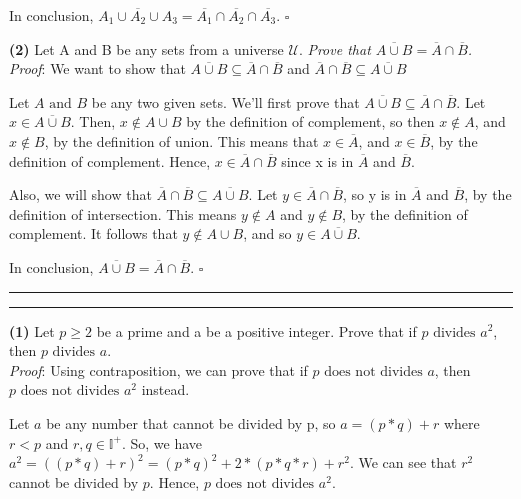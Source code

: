 \documentclass[a4paper, 11pt]{article}
\newcommand{\question}[2] {\vspace{.25in} \hrule\vspace{0.5em}
	\noindent{\bf #1: #2} \vspace{0.5em}
	\hrule \vspace{.10in}}
\renewcommand{\part}[1] {\vspace{.10in} {\bf (#1)}}
\begin{document}
	In conclusion, $ \overline{A_1 \cup A_2 \cup A_3} = \overline{A_1} \cap \overline{A_2} \cap \overline{A_3}$. $\square$
	
	
	\part{2} Let A and B be any sets from a universe $\mathcal{U}$. 
	{\em Prove that $ \overline{A \cup B} = \overline{A} \cap \overline{B}$.}\\
	
	{\em Proof}: We want to show that $\overline{A \cup B} \subseteq \overline{A} \cap \overline{B}$
	and $\overline{A} \cap \overline{B} \subseteq \overline{A \cup B} $
	
	Let $A \text{ and } B$ be any two given sets. We'll first prove that
	$\overline{A \cup B} \subseteq \overline{A} \cap \overline{B}$.
	Let $x \in \overline{A \cup B}$. Then, $x \notin A \cup B$ by the definition of complement, so then $x \notin A$, and $x \notin B$, by the definition of union. This means that $x \in \overline{A}$, and $x \in \overline{B}$, by the definition of complement. 
	Hence, $x \in \overline{A} \cap \overline{B}$ 
	since x is in $\overline{A} $ and $ \overline{B}$.
	
	Also, we will show that $\overline{A} \cap \overline{B} \subseteq \overline{A \cup B} $. Let $y \in \overline{A} \cap \overline{B}$, so y is in $\overline{A} $ and $ \overline{B}$, by the definition of intersection. 
	This means $y \notin A$ and $y \notin B$, by the definition of complement. It follows that $y \notin A \cup B$, and so $y \in \overline{A \cup B}$.
	
	In conclusion, $ \overline{A \cup B} = \overline{A} \cap \overline{B}$. $\square$

	
	\question{2}{Prime and Irrational}
	
	\part{1} Let $p \geq 2$ be a prime and a be a positive integer. Prove that if $p  \text{ divides } a^2$, then $p \text{ divides } a$.\\
	
	{\em Proof}: Using contraposition, we can prove that if $p \text{ does not divides } a$, then $p \text{ does not divides } a^2$ instead.
	
	Let $a$ be any number that cannot be divided by p, so $ a = (p*q) + r$ where $r < p$ and $r,q \in \mathbb{I^+}$. So, we have $a^2 = ((p*q) + r)^2 = (p*q)^2 + 2*(p*q*r) + r^2$. We can see that $r^2$ cannot be divided by $p$. Hence, $p \text{ does not divides } a^2$. 
	
\end{document}
